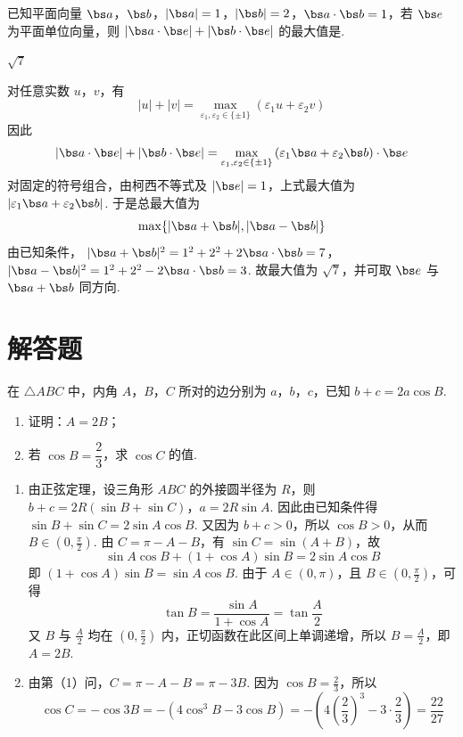 \begin{problem}
已知平面向量 \(\bs a\)，\(\bs b\)，\(|\bs a|=1\)，\(|\bs b|=2\)，\(\bs a\cdot\bs b=1\)，若 \(\bs e\) 为平面单位向量，则 \(|\bs a\cdot\bs e|+|\bs b\cdot\bs e|\) 的最大值是\fillinblank{}.
\end{problem}

\begin{answer}
\(\sqrt7\)
\end{answer}

\begin{solution}
对任意实数 \(u\)，\(v\)，有
\[
|u|+|v|=\max_{\varepsilon_1,\varepsilon_2\in\{\pm1\}}
\left(\varepsilon_1u+\varepsilon_2v\right)
\]
因此
\[
|\bs a\cdot\bs e|+|\bs b\cdot\bs e|
=\max_{\varepsilon_1,\varepsilon_2\in\{\pm1\}}
\left(\varepsilon_1\bs a+\varepsilon_2\bs b\right)\cdot\bs e
\]
对固定的符号组合，由柯西不等式及 \(|\bs e|=1\)，上式最大值为 \(|\varepsilon_1\bs a+\varepsilon_2\bs b|\). 于是总最大值为
\[
\max\{|\bs a+\bs b|,|\bs a-\bs b|\}
\]
由已知条件，
\(|\bs a+\bs b|^2=1^2+2^2+2\bs a\cdot\bs b=7\)，\(|\bs a-\bs b|^2=1^2+2^2-2\bs a\cdot\bs b=3\).
故最大值为 \(\sqrt7\)，并可取 \(\bs e\) 与 \(\bs a+\bs b\) 同方向.
\end{solution}

\section{解答题}

\begin{problem}
在 \(\triangle ABC\) 中，内角 \(A\)，\(B\)，\(C\) 所对的边分别为 \(a\)，\(b\)，\(c\)，已知 \(b+c=2a\cos B\).

\begin{enumerate}
\item 证明：\(A=2B\)；
\item 若 \(\cos B=\dfrac23\)，求 \(\cos C\) 的值.
\end{enumerate}
\end{problem}

\begin{solution}
\begin{enumerate}
\item 由正弦定理，设三角形 \(ABC\) 的外接圆半径为 \(R\)，则
\(b+c=2R(\sin B+\sin C)\)，\(a=2R\sin A\).
因此由已知条件得 \(\sin B+\sin C=2\sin A\cos B\). 又因为 \(b+c>0\)，所以 \(\cos B>0\)，从而 \(B\in(0,\frac{\pi}{2})\). 由 \(C=\pi-A-B\)，有 \(\sin C=\sin(A+B)\)，故
\[
\sin A\cos B+(1+\cos A)\sin B=2\sin A\cos B
\]
即 \((1+\cos A)\sin B=\sin A\cos B\). 由于 \(A\in(0,\pi)\)，且 \(B\in(0,\frac{\pi}{2})\)，可得
\[
\tan B=\frac{\sin A}{1+\cos A}=\tan\frac A2
\]
又 \(B\) 与 \(\frac A2\) 均在 \((0,\frac{\pi}{2})\) 内，正切函数在此区间上单调递增，所以 \(B=\frac A2\)，即 \(A=2B\).

\item 由第（1）问，\(C=\pi-A-B=\pi-3B\). 因为 \(\cos B=\frac23\)，所以
\[
\cos C=-\cos 3B=-\left(4\cos^3B-3\cos B\right)
=-\left(4\left(\frac23\right)^3-3\cdot\frac23\right)=\frac{22}{27}
\]
\end{enumerate}
\end{solution}

